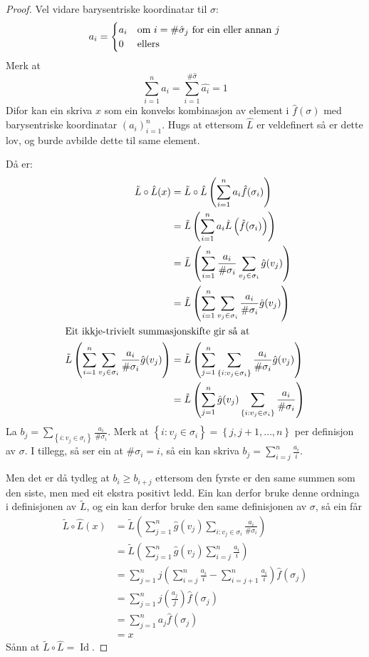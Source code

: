 \documentclass[a4paper, 12pt, norsk]{article}
\theoremstyle{plain}
\theoremstyle{definition}
\newcommand{\set}[1]{ \left\{ #1 \right\} } %
\newcommand{\tuple}[1]{ \left( #1 \right) } %
\DeclareMathOperator{\Id}{Id} %
\begin{document}
\begin{proof}
	Vel vidare barysentriske koordinatar til \( \sigma \):
	\[
		a_i =
		\begin{cases}
			a_i & \text{om \( i = \#\hat{\sigma}_j \) for ein eller annan \( j \)} \\
			0 & \text{ellers}
		\end{cases}
	\]
	Merk at
	\[
		\sum_{i=1}^n a_i = \sum_{i=1}^{\#\hat{\sigma}}\hat{a_i}=1
	\]
	Difor kan ein skriva \( x \) som ein konveks kombinasjon av element i \( \hat{f}(\sigma) \) med barysentriske koordinatar \( \tuple{a_i}_{i=1}^n \). Hugs at ettersom \( \hat{L} \) er veldefinert så er dette lov, og burde avbilde dette til same element.

	Då er:
	\begin{align*}
		\tilde{L}\circ\hat{L}(x) &= \tilde{L}\circ\hat{L}\tuple{\sum_{i=1}^n a_i \hat{f}(\sigma_i)} \\
		&= \tilde{L}\tuple{\sum_{i=1}^n a_i \hat{L}\tuple{\hat{f}(\sigma_i)}} \\
		&= \tilde{L}\tuple{\sum_{i=1}^n \frac{a_i}{\#\sigma_i}\sum_{v_j \in \sigma_i}\hat{g}(v_j)} \\
		&= \tilde{L}\tuple{\sum_{i=1}^n\sum_{v_j \in \sigma_i}\frac{a_i}{\#\sigma_i}\hat{g}(v_j)} \\
		\intertext{Eit ikkje-trivielt summasjonskifte gir så at}
		\tilde{L}\tuple{\sum_{i=1}^n\sum_{v_j \in \sigma_i}\frac{a_i}{\#\sigma_i}\hat{g}(v_j)} &= \tilde{L}\tuple{\sum_{j=1}^n\sum_{\set{i:v_j\in\sigma_i}}\frac{a_i}{\#\sigma_i}\hat{g}(v_j)} \\
		&= \tilde{L}\tuple{\sum_{j=1}^n \hat{g}(v_j) \sum_{\set{i:v_j\in\sigma_i}}\frac{a_i}{\#\sigma_i}}
	\end{align*}
	La \( b_j = \sum_{\set{i:v_j\in\sigma_i}}\frac{a_i}{\#\sigma_i} \). Merk at \( \set{i : v_j \in \sigma_i} = \set{j, j+1, \dots, n } \) per definisjon av \( \sigma \). I tillegg, så ser ein at \( \#\sigma_i = i \), så ein kan skriva \( b_j = \sum_{i=j}^n \frac{a_i}{i} \).

	Men det er då tydleg at \( b_i \geq b_{i+j} \) ettersom den fyrste er den same summen som den siste, men med eit ekstra positivt ledd. Ein kan derfor bruke denne ordninga i definisjonen av \( \tilde{L} \), og ein kan derfor bruke den same definisjonen av \( \sigma \), så ein får
	\begin{align*}
		\tilde{L}\circ\hat{L}(x) &= \tilde{L}\tuple{\sum_{j=1}^n \hat{g}(v_j) \sum_{i:v_j\in\sigma_i}\frac{a_i}{\#\sigma_i}} \\
		&= \tilde{L}\tuple{\sum_{j=1}^n \hat{g}(v_j) \sum_{i=j}^n \frac{a_i}{i}} \\
		&= \sum_{j=1}^n j\tuple{\sum_{i=j}^n \frac{a_i}{i} - \sum_{i=j+1}^n \frac{a_i}{i}}\hat{f}(\sigma_j) \\
		&= \sum_{j=1}^n j\tuple{\frac{a_j}{j}}\hat{f}(\sigma_j) \\
		&= \sum_{j=1}^n a_j \hat{f}(\sigma_j) \\
		&= x
	\end{align*}
	Sånn at \( \tilde{L}\circ\hat{L} = \Id \). 
	

\end{proof}
\end{document}
